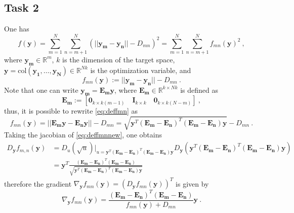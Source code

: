 \documentclass[12pt]{article}
\begin{document}
\subsection{Task 2}
One has 
\begin{equation}\label{eq:deff}
f(\mathbf{y}) = \sum_{m=1}^{N}\sum_{n=m+1}^{N}(||\mathbf{y_m}-\mathbf{y_n}||-D_{mn})^2 = \sum_{m=1}^{N}\sum_{n=m+1}^{N} f_{mn}(\mathbf{y})^2 \:,
\end{equation}
where $\mathbf{y_m}\in \mathbb{R}^m$, $k$ is the dimension of the target space, $\mathbf{y} = \mathrm{col}(\mathbf{y_1},\ldots,\mathbf{y_N}) \in \mathbb{R}^{Nk}$ is the optimization variable, and 
\begin{equation}\label{eq:deffmn}
f_{mn}(\mathbf{y}) := ||\mathbf{y_m}-\mathbf{y_n}||-D_{mn}\:.
\end{equation}
Note that one can write $\mathbf{y_m} = \mathbf{E_m}\mathbf{y}$, where $\mathbf{E_m}\in \mathbb{R}^{k\times Nk}$ is defined as 
\begin{equation*}\label{key}
\mathbf{E_m} := \left[\mathbf{0}_{k\times k(m-1)} \quad \mathbf{I}_{k\times k} \quad \mathbf{0}_{k\times k(N-m)}  \right]\:, 
\end{equation*}
thus, it is possible to rewrite \eqref{eq:deffmn} as
\begin{equation}\label{eq:deffmnnew}
f_{mn}(\mathbf{y}) = ||\mathbf{E_m}\mathbf{y}-\mathbf{E_n}\mathbf{y}||-D_{mn} = \sqrt{\mathbf{y}^T(\mathbf{E_m}-\mathbf{E_n})^T(\mathbf{E_m}-\mathbf{E_n})\mathbf{y}}-D_{mn}\:.
\end{equation}
Taking the jacobian of \eqref{eq:deffmnnew}, one obtains
\begin{equation*}\label{key}
\begin{split}
D_{\mathbf{y}}f_{m,n}(\mathbf{y}) &= D_u(\sqrt{u})\biggr\rvert_{u = \mathbf{y}^T(\mathbf{E_m}-\mathbf{E_n})^T(\mathbf{E_m}-\mathbf{E_n})\mathbf{y}}D_{\mathbf{y}}(\mathbf{y}^T(\mathbf{E_m}-\mathbf{E_n})^T(\mathbf{E_m}-\mathbf{E_n})\mathbf{y})\\
&= \mathbf{y}^T\frac{(\mathbf{E_m}-\mathbf{E_n})^T(\mathbf{E_m}-\mathbf{E_n})}{\sqrt{\mathbf{y}^T(\mathbf{E_m}-\mathbf{E_n})^T(\mathbf{E_m}-\mathbf{E_n})\mathbf{y}}}
\end{split}
\end{equation*}
therefore the gradient $\nabla_{\mathbf{y}} f_{mn}(\mathbf{y}) = \left(D_{\mathbf{y}}f_{mn}(\mathbf{y})\right)^T$ is given by
\begin{equation}\label{eq:gradfmn}
\nabla_{\mathbf{y}} f_{mn}(\mathbf{y}) =  \frac{(\mathbf{E_m}-\mathbf{E_n})^T(\mathbf{E_m}-\mathbf{E_n})}{f_{mn}(\mathbf{y})+D_{mn}} \mathbf{y}\:.
\end{equation}
\end{document}
